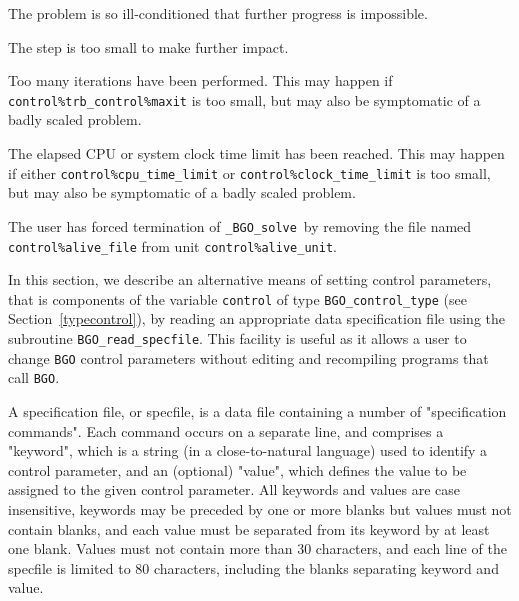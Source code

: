 \documentclass{galahad}
\newcommand{\packagename}{BGO}
\newcommand{\fullpackagename}{\libraryname\_\packagename}
\newcommand{\solver}{{\tt \fullpackagename\_solve}}
\begin{document}
\begin{description}
 The problem is so ill-conditioned that
  further progress is impossible.

 The step is too small to make further impact.

 Too many iterations have been performed.
  This may happen if
    {\tt control\%trb\_control\%maxit} is too small, but may also be 
    symptomatic of a badly scaled problem.

 The elapsed CPU or system clock time limit has been
    reached. This may happen if either {\tt control\%cpu\_time\_limit} or
    {\tt control\%clock\_time\_limit} is too small, but may also be symptomatic
    of a badly scaled problem.

 The user has forced termination of \solver\
     by removing the file named {\tt control\%a\-live\_file} from
     unit {\tt control\%alive\_unit}.

\end{description}


\galfeatures
\noindent In this section, we describe an alternative means of setting
control parameters, that is components of the variable {\tt control} of type
{\tt \packagename\_control\_type}
(see Section~\ref{typecontrol}),
by reading an appropriate data specification file using the
subroutine {\tt \packagename\_read\_specfile}. This facility
is useful as it allows a user to change  {\tt \packagename} control parameters
without editing and recompiling programs that call {\tt \packagename}.

A specification file, or specfile, is a data file containing a number of
"specification commands". Each command occurs on a separate line,
and comprises a "keyword",
which is a string (in a close-to-natural language) used to identify a
control parameter, and
an (optional) "value", which defines the value to be assigned to the given
control parameter. All keywords and values are case insensitive,
keywords may be preceded by one or more blanks but
values must not contain blanks, and
each value must be separated from its keyword by at least one blank.
Values must not contain more than 30 characters, and
each line of the specfile is limited to 80 characters,
including the blanks separating keyword and value.
\end{document}
